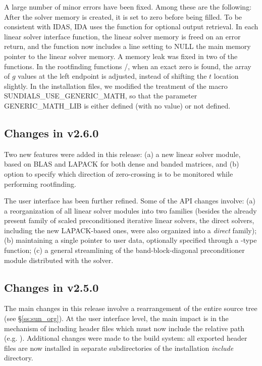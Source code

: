 A large number of minor errors have been fixed.  Among these are the following:
After the solver memory is created, it is set to zero before being filled.
To be consistent with IDAS, IDA uses the function  for
optional output retrieval.
In each linear solver interface function, the linear solver memory is
freed on an error return, and the  function now includes a
line setting to NULL the main memory pointer to the linear solver memory.
A memory leak was fixed in two of the  functions.
In the rootfinding functions /, when an exact
zero is found, the array  of $g$ values at the left endpoint is
adjusted, instead of shifting the $t$ location  slightly.
In the installation files, we modified the treatment of the macro
SUNDIALS\_USE\_GENERIC\_MATH, so that the parameter GENERIC\_MATH\_LIB is
either defined (with no value) or not defined.

\subsection*{Changes in v2.6.0}

Two new features were added in this release: (a) a new linear solver module,
based on BLAS and LAPACK for both dense and banded matrices, and (b) option
to specify which direction of zero-crossing is to be monitored while performing
rootfinding. 

The user interface has been further refined. Some of the API changes involve:
(a) a reorganization of all linear solver modules into two families (besides 
the already present family of scaled preconditioned iterative linear solvers,
the direct solvers, including the new LAPACK-based ones, were also organized 
into a {\em direct} family); (b) maintaining a single pointer to user data,
optionally specified through a -type function; (c) a general 
streamlining of the band-block-diagonal preconditioner module distributed 
with the solver.

\subsection*{Changes in v2.5.0}

The main changes in this release involve a rearrangement of the entire 
{\sundials} source tree (see \S\ref{ss:sun_org}). At the user interface 
level, the main impact is in the mechanism of including {\sundials} header
files which must now include the relative path (e.g. ).
Additional changes were made to the build system: all exported header files are
now installed in separate subdirectories of the installation {\em include} directory.

